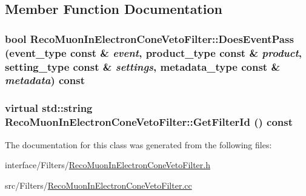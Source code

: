 \subsection{Member Function Documentation}
\hypertarget{classRecoMuonInElectronConeVetoFilter_a28c2389ed3a5a3b4b5f21b50cccb14d7}{
\subsubsection[{DoesEventPass}]{\setlength{\rightskip}{0pt plus 5cm}bool RecoMuonInElectronConeVetoFilter::DoesEventPass (event\_\-type const \& {\em event}, \/  product\_\-type const \& {\em product}, \/  setting\_\-type const \& {\em settings}, \/  metadata\_\-type const \& {\em metadata}) const}}
\label{classRecoMuonInElectronConeVetoFilter_a28c2389ed3a5a3b4b5f21b50cccb14d7}
\hypertarget{classRecoMuonInElectronConeVetoFilter_a8b2194629ef6648e295babb183f28602}{
\subsubsection[{GetFilterId}]{\setlength{\rightskip}{0pt plus 5cm}virtual std::string RecoMuonInElectronConeVetoFilter::GetFilterId () const}}
\label{classRecoMuonInElectronConeVetoFilter_a8b2194629ef6648e295babb183f28602}


The documentation for this class was generated from the following files:\begin{DoxyCompactItemize}
\item 
interface/Filters/\hyperlink{RecoMuonInElectronConeVetoFilter_8h}{RecoMuonInElectronConeVetoFilter.h}\item 
src/Filters/\hyperlink{RecoMuonInElectronConeVetoFilter_8cc}{RecoMuonInElectronConeVetoFilter.cc}\end{DoxyCompactItemize}
